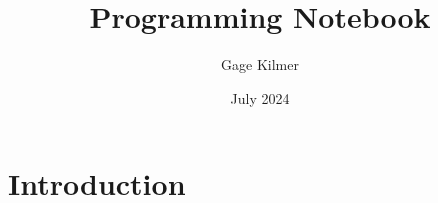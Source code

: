 \documentclass{article}
\title{Programming Notebook}
\author{Gage Kilmer}
\date{July 2024}
\begin{document}
\maketitle

\section{Introduction}
\end{document}
